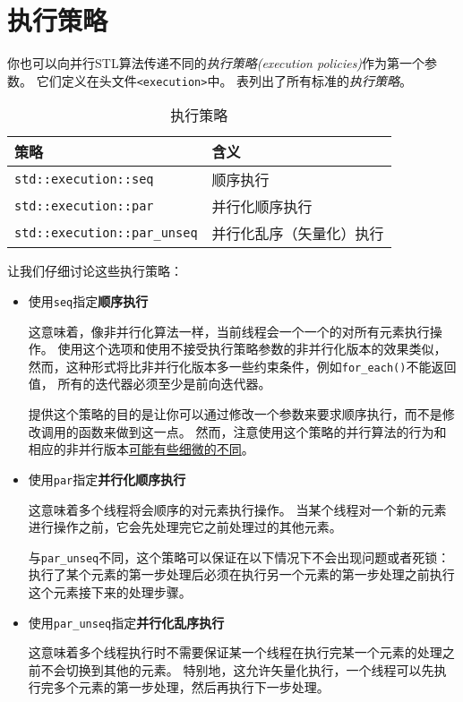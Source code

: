 \section{执行策略}\label{ch22.2}
你也可以向并行STL算法传递不同的\emph{执行策略(execution policies)}作为第一个参数。
它们定义在头文件\texttt{<execution>}中。
表列出了所有标准的\emph{执行策略}。
\begin{table}[htb]
    \centering
    \begin{tabular}{l|l}
        \hline
        \textbf{策略}                         & \textbf{含义}  \\
        \hline
        \texttt{std::execution::seq}        & 顺序执行         \\
        \texttt{std::execution::par}        & 并行化顺序执行      \\
        \texttt{std::execution::par\_unseq} & 并行化乱序（矢量化）执行 \\
        \hline
    \end{tabular}
    \caption{执行策略}
    \label{t22.1}
\end{table}

让我们仔细讨论这些执行策略：
\begin{itemize}
    \item 使用\texttt{seq}指定\textbf{顺序执行}

    这意味着，像非并行化算法一样，当前线程会一个一个的对所有元素执行操作。
    使用这个选项和使用不接受执行策略参数的非并行化版本的效果类似，
    然而，这种形式将比非并行化版本多一些约束条件，例如\texttt{for\_each()}不能返回值，
    所有的迭代器必须至少是前向迭代器。

    提供这个策略的目的是让你可以通过修改一个参数来要求顺序执行，而不是修改调用的函数来做到这一点。
    然而，注意使用这个策略的并行算法的行为和相应的非并行版本\hyperref[ch22.4]{可能有些细微的不同}。

    \item 使用\texttt{par}指定\textbf{并行化顺序执行}

    这意味着多个线程将会顺序的对元素执行操作。
    当某个线程对一个新的元素进行操作之前，它会先处理完它之前处理过的其他元素。

    与\texttt{par\_unseq}不同，这个策略可以保证在以下情况下不会出现问题或者死锁：
    执行了某个元素的第一步处理后必须在执行另一个元素的第一步处理之前执行这个元素接下来的处理步骤。
    \item 使用\texttt{par\_unseq}指定\textbf{并行化乱序执行}

    这意味着多个线程执行时不需要保证某一个线程在执行完某一个元素的处理之前不会切换到其他的元素。
    特别地，这允许矢量化执行，一个线程可以先执行完多个元素的第一步处理，然后再执行下一步处理。
\end{itemize}

